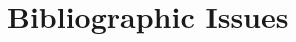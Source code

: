 \documentclass[a4paper,11pt]{memoir}
\begin{document}
%




\chapter{Bibliographic Issues}
\label{ch:bibliographic}



\appendix



\end{document}
